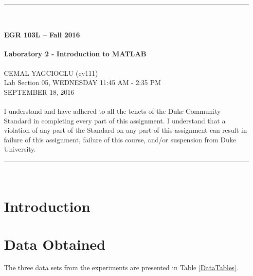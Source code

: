 \documentclass{article}
\begin{document}
\begin{center}
\rule{6.5in}{0.5mm}\\~\\
{\bf \large EGR 103L -- Fall 2016}\\~\\
{\huge \bf Laboratory 2 - Introduction to MATLAB}\\~\\
CEMAL YAGCIOGLU (cy111)\\
Lab Section 05, WEDNESDAY 11:45 AM - 2:35 PM\\
SEPTEMBER 18, 2016\\~\\
{\small I understand and have adhered to all the tenets of the Duke
  Community Standard in completing every part of this assignment.  I
  understand that a violation of any part of the Standard on any part
  of this assignment can result in failure of this assignment, failure
  of this course, and/or suspension from Duke University.} 
\rule{6.5in}{0.5mm}\\
\end{center}
\tableofcontents
\listoffigures
\pagebreak

\section{Introduction}

\section{Data Obtained}
The three data sets from the experiments are presented in Table
\ref{DataTables}.
\end{document}
